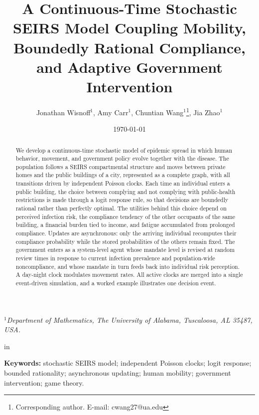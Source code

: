 \documentclass[11pt]{article}
\title{A Continuous-Time Stochastic SEIRS Model Coupling Mobility, Boundedly Rational Compliance, and Adaptive Government Intervention}
\author{Jonathan Wisnoff$^{1}$, Amy Carr$^{1}$, Chuntian Wang$^{1}$\thanks{Corresponding author. E-mail: cwang27@ua.edu}, Jia Zhao$^{1}$}
\date{\today}
\theoremstyle{definition}
\theoremstyle{plain}
\begin{document}
\maketitle

\vspace{-1em}
\begin{small}
\centerline{$^{1}$\emph{Department of Mathematics, The University of Alabama, Tuscaloosa, AL 35487, USA.}}
\end{small}

 in

\begin{abstract}
We develop a continuous-time stochastic model of epidemic spread in which human behavior, movement, and government policy evolve together with the disease. The population follows a SEIRS compartmental structure and moves between private homes and the public buildings of a city, represented as a complete graph, with all transitions driven by independent Poisson clocks. Each time an individual enters a public building, the choice between complying and not complying with public-health restrictions is made through a logit response rule, so that decisions are boundedly rational rather than perfectly optimal. The utilities behind this choice depend on perceived infection risk, the compliance tendency of the other occupants of the same building, a financial burden tied to income, and fatigue accumulated from prolonged compliance. Updates are asynchronous: only the arriving individual recomputes their compliance probability while the stored probabilities of the others remain fixed. The government enters as a system-level agent whose mandate level is revised at random review times in response to current infection prevalence and population-wide noncompliance, and whose mandate in turn feeds back into individual risk perception. A day-night clock modulates movement rates. All active clocks are merged into a single event-driven simulation, and a worked example illustrates one decision event.
\end{abstract}

\noindent\textbf{Keywords:} stochastic SEIRS model; independent Poisson clocks; logit response; bounded rationality; asynchronous updating; human mobility; government intervention; game theory.

\tableofcontents
\end{document}
